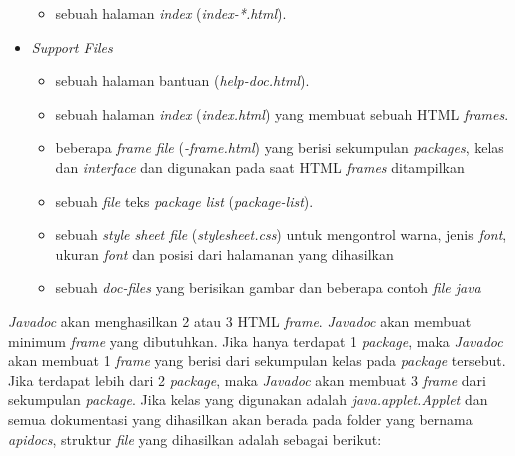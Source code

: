\begin{itemize}
\begin{itemize}
		\item sebuah halaman {\it index} ({\it index-*.html}).
	\end{itemize}
	\item {\it Support Files}
	\begin{itemize}
		\item sebuah halaman bantuan ({\it help-doc.html}).
		\item sebuah halaman {\it index} ({\it index.html}) yang membuat sebuah HTML {\it frames}.
		\item beberapa {\it frame file} ({\it *-frame.html}) yang berisi sekumpulan {\it packages}, kelas dan {\it interface} dan digunakan pada saat HTML {\it frames} ditampilkan
		\item sebuah {\it file} teks {\it package list} ({\it package-list}).
		\item sebuah {\it style sheet file} ({\it stylesheet.css}) untuk mengontrol warna, jenis {\it font}, ukuran {\it font} dan posisi dari halamanan yang dihasilkan
		\item sebuah {\it doc-files} yang berisikan gambar dan beberapa contoh {\it file java}
	\end{itemize}
\end{itemize}
{\it Javadoc} akan menghasilkan 2 atau 3 HTML {\it frame}. {\it Javadoc} akan membuat minimum {\it frame} yang dibutuhkan. Jika hanya terdapat 1 {\it package}, maka {\it Javadoc} akan membuat 1 {\it frame} yang berisi dari sekumpulan kelas pada {\it package} tersebut. Jika terdapat lebih dari 2 {\it package}, maka {\it Javadoc} akan membuat 3 {\it frame} dari sekumpulan {\it package}. Jika kelas yang digunakan adalah {\it java.applet.Applet} dan semua dokumentasi yang dihasilkan akan berada pada folder yang bernama {\it apidocs}, struktur {\it file} yang dihasilkan adalah sebagai berikut:
